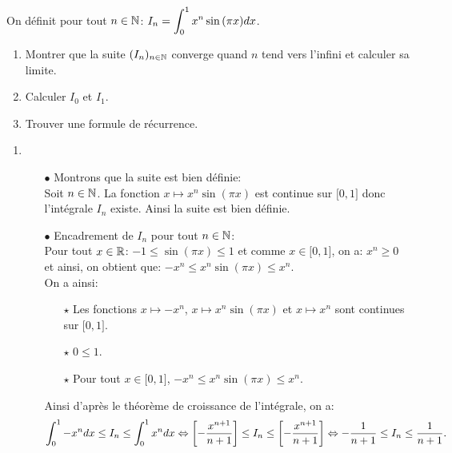 \documentclass[a4paper, 11pt,reqno]{article}
\begin{document}
\begin{exercice}  \;
	On d\'efinit pour tout $n\in\mathbb{N}$: $I_n=\displaystyle \int_0^1 x^n\sin{(\pi x)}dx$.
	\begin{enumerate}
		\item Montrer que la suite $(I_n)_{n\in\mathbb{N}}$ converge quand $n$ tend vers l'infini et calculer sa limite.
		\item Calculer $I_0$ et $I_1$.
		\item Trouver une formule de r\'ecurrence.
	\end{enumerate}
\end{exercice}
\begin{correction}\;
	\begin{enumerate}
		\item
		      \begin{itemize}
			      \item[$\bullet$] Montrons que la suite est bien d\'efinie:\\
			            \noindent Soit $n\in\mathbb{N}$. La fonction $x\mapsto x^n\sin{(\pi x)}$ est continue sur $\lbrack 0,1\rbrack$ donc l'int\'egrale $I_n$ existe. Ainsi la suite est bien d\'efinie.
			      \item[$\bullet$] Encadrement de $I_n$ pour tout $n\in\mathbb{N}$:\\
			            \noindent Pour tout $x\in\mathbb{R}$: $-1\leq \sin{(\pi x)}\leq 1$ et comme $x\in\lbrack 0,1\rbrack$, on a: $x^n\geq 0$ et ainsi, on obtient que: $-x^n\leq x^n \sin{(\pi x)}\leq x^n$. \\
			            \noindent On a ainsi:
			            \begin{itemize}
				            \item[$\star$] Les fonctions $x\mapsto -x^n$, $x\mapsto x^n\sin{(\pi x)}$ et $x\mapsto x^n$ sont continues sur $\lbrack 0,1\rbrack$.
				            \item[$\star$] $0\leq 1$.
				            \item[$\star$] Pour tout $x\in\lbrack 0,1\rbrack$, $-x^n \leq x^n\sin{(\pi x)}\leq x^n$.
			            \end{itemize}
			            Ainsi d'apr\`{e}s le th\'eor\`{e}me de croissance de l'int\'egrale, on a:
			            $$\int_0^1 -x^n dx \leq I_n \leq \int_0^1 x^n dx\Leftrightarrow \left\lbrack -\displaystyle\frac{x^{n+1}}{n+1} \right\rbrack \leq I_n \leq \left\lbrack -\displaystyle\frac{x^{n+1}}{n+1} \right\rbrack\Leftrightarrow -\displaystyle\frac{1}{n+1}\leq I_n \leq \displaystyle\frac{1}{n+1}.$$

\end{itemize}
\end{enumerate}
\end{correction}
\end{document}
